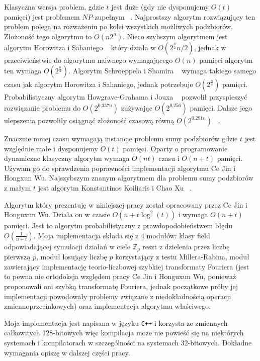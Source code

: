 \documentclass{article}
\begin{document}
Klasyczna wersja problem, gdzie $t$ jest duże (gdy nie dysponujemy $O(t)$ pamięci) jest problemem 
$NP$-zupełnym ~\cite{sasamoto2001statistical}. Najprostszy algorytm rozwiązujący ten problem polega na rozważeniu po kolei wszystkich 
możliwych podzbiorów. Złożoność tego algorytmu to $O(n2^n)$. Nieco szybszym algorytmem jest algorytm Horowitza
i Sahaniego ~\cite{horowitz1974computing} który działa w $O(2^{\frac{n}{2}}n/2)$, jednak w przeciwieństwie do algorytmu naiwnego wymagającego
$O(n)$ pamięci algorytm ten wymaga $O(2^{\frac{n}{2}})$. Algorytm Schroeppela i Shamira ~\cite{schroeppel1981t} wymaga takiego samego
czasu jak algorytm Horowitza i Sahaniego, jednak potrzebuje $O(2^{\frac{n}{4}})$ pamięci. Probabilistyczny 
algorytm Howgrave-Grahama i Jouxa ~\cite{howgrave2010new} pozwolił przyspieszyć rozwiązanie problemu do $O(2^{0.337n})$
zużywając $O(2^{0.256})$ pamięci. Dalsze jego ulepszenia pozwoliły osiągnąć złożoność czasową równą 
$O(2^{0.291n})$ ~\cite{becker2011improved}.

Znacznie mniej czasu wymagają instancje problemu sumy podzbiorów gdzie $t$ jest względnie małe i dysponujemy
$O(t)$ pamięci. Oparty o programowanie dynamiczne klasyczny algorytm wymaga $O(nt)$ czasu i $O(n+t)$ pamięci.
Używam go do sprawdzenia poprawności implementacji algorytmu Ce Jin i Hongxun Wu. Najszybszym znanym algorytmem 
dla problemu sumy podzbiorów z małym $t$ jest algorytm Konstantinos Koiliaris i Chao Xu ~\cite{bach1997comments}. 

Algorytm który prezentuję w niniejszej pracy został opracowany przez Ce Jin i Honguxun Wu. Działa on w czasie 
$O(n+t\log^2(t))$ i wymaga $O(n+t)$ pamięci. Jest to algorytm probabilistyczny z prawdopodobieństwem błędu $O(\frac{1}{n+t})$.
Moja implementacja składa się z 4 modułów: klasy field odpowiadającej symulacji 
działań w ciele $\mathbb{Z}_p$ reszt z dzielenia przez liczbę pierwszą $p$, moduł losujący liczbę $p$ korzystający z testu 
Millera-Rabina,
moduł zawierający implementację teorio-liczbowej szybkiej transformaty Fouriera (jest to pewna nie ortodoksja względem pracy
Ce Jin i Honguxun Wu, ponieważ proponowali oni szybką transformatę Fouriera, jednak początkowe próby jej implementacji
powodowały problemy związane z niedokładnością operacji zmiennoprzecinkowych) oraz implementacja algorytmu właściwego.

Moja implementacja jest napisana w języku \texttt{C++} i korzysta ze zmiennych całkowitych 128-bitowych więc kompilacja może nie 
powieść się na niektórych systemach i kompilatorach w szczególności na systemach 32-bitowych. Dokładne wymagania opiszę
w dalszej części pracy.
\end{document}
